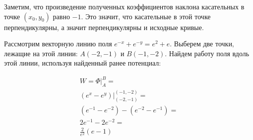 Заметим, что произведение полученных коэффициентов наклона касательных в точке
\((x_0, y_0)\) равно \(-1\). Это значит, что касательные в этой точке
перпендикулярны, а значит перпендикулярны и исходные кривые.

\begin{figure}[!htbp]
  \centering
\end{figure}

\bigskip

Рассмотрим векторную линию поля \(e^{-x} + e^{-y} = e^2 + e\). Выберем две
точки, лежащие на этой линии: \(A(-2, -1)\) и \(B(-1, -2)\). Найдем работу поля
вдоль этой линии, используя найденный ранее потенциал:

\begin{equation*}
  \begin{split}
    W = \Phi \bigg\vert_A^B = \\
    (e^x - e^y) \bigg\vert_{(-2, -1)}^{(-1, -2)} = \\
    (e^{-1} - e^{-2}) - (e^{-2} - e^{-1}) = \\
    2e^{-1} - 2e^{-2} = \\
    \frac{2}{e^2}(e - 1)
  \end{split}
\end{equation*}
